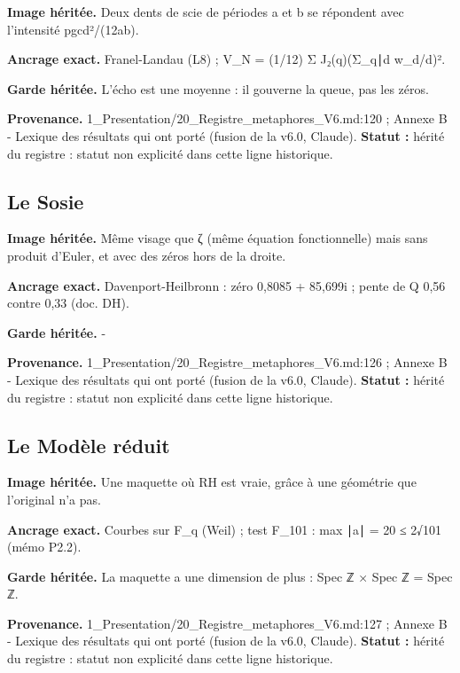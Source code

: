 \documentclass[
  9pt,
  a4paper,
]{article}
\begin{document}
\textbf{Image héritée.} Deux dents de scie de périodes a et b se
répondent avec l'intensité pgcd²/(12ab).

\textbf{Ancrage exact.} Franel-Landau (L8) ; V\_N = (1/12) Σ
J₂(q)(Σ\_q∣d w\_d/d)².

\textbf{Garde héritée.} L'écho est une moyenne : il gouverne la queue,
pas les zéros.

\textbf{Provenance.} 1\_Presentation/20\_Registre\_metaphores\_V6.md:120
; Annexe B - Lexique des résultats qui ont porté (fusion de la v6.0,
Claude). \textbf{Statut :} hérité du registre : statut non explicité
dans cette ligne historique.

\hypertarget{le-sosie}{%
\subsection{Le Sosie}\label{le-sosie}}

\textbf{Image héritée.} Même visage que ζ (même équation fonctionnelle)
mais sans produit d'Euler, et avec des zéros hors de la droite.

\textbf{Ancrage exact.} Davenport-Heilbronn : zéro 0,8085 + 85,699i ;
pente de Q 0,56 contre 0,33 (doc. DH).

\textbf{Garde héritée.} -

\textbf{Provenance.} 1\_Presentation/20\_Registre\_metaphores\_V6.md:126
; Annexe B - Lexique des résultats qui ont porté (fusion de la v6.0,
Claude). \textbf{Statut :} hérité du registre : statut non explicité
dans cette ligne historique.

\hypertarget{le-moduxe8le-ruxe9duit}{%
\subsection{Le Modèle réduit}\label{le-moduxe8le-ruxe9duit}}

\textbf{Image héritée.} Une maquette où RH est vraie, grâce à une
géométrie que l'original n'a pas.

\textbf{Ancrage exact.} Courbes sur F\_q (Weil) ; test F\_101 : max ∣a∣
= 20 ≤ 2√101 (mémo P2.2).

\textbf{Garde héritée.} La maquette a une dimension de plus : Spec ℤ ×
Spec ℤ = Spec ℤ.

\textbf{Provenance.} 1\_Presentation/20\_Registre\_metaphores\_V6.md:127
; Annexe B - Lexique des résultats qui ont porté (fusion de la v6.0,
Claude). \textbf{Statut :} hérité du registre : statut non explicité
dans cette ligne historique.
\end{document}
